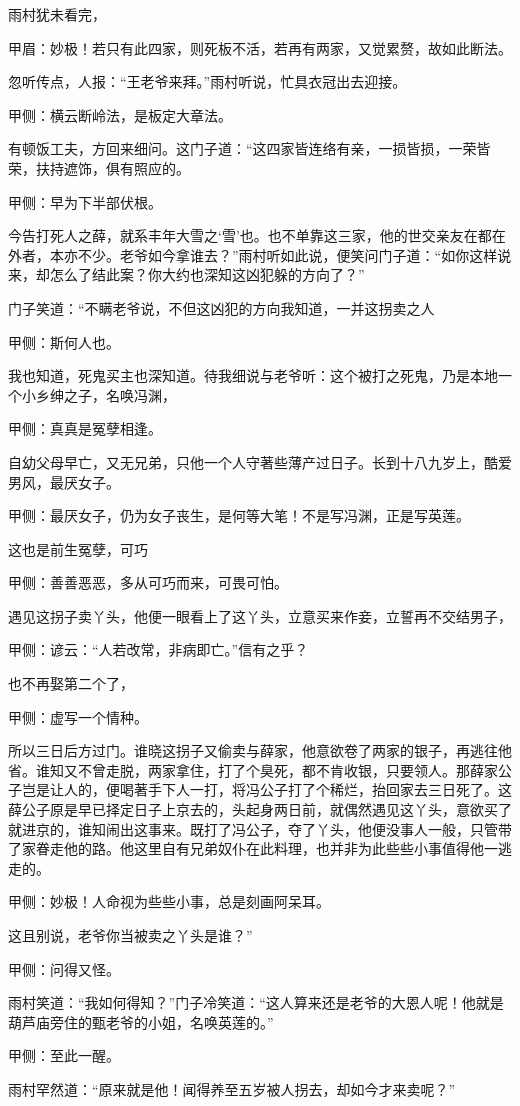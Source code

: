 \begin{parag}
    雨村犹未看完，\begin{note}甲眉：妙极！若只有此四家，则死板不活，若再有两家，又觉累赘，故如此断法。\end{note}忽听传点，人报：“王老爷来拜。”雨村听说，忙具衣冠出去迎接。\begin{note}甲侧：横云断岭法，是板定大章法。\end{note}有顿饭工夫，方回来细问。这门子道：“这四家皆连络有亲，一损皆损，一荣皆荣，扶持遮饰，俱有照应的。\begin{note}甲侧：早为下半部伏根。\end{note}今告打死人之薛，就系丰年大雪之‘雪’也。也不单靠这三家，他的世交亲友在都在外者，本亦不少。老爷如今拿谁去？”雨村听如此说，便笑问门子道：“如你这样说来，却怎么了结此案？你大约也深知这凶犯躲的方向了？”
\end{parag}


\begin{parag}
    门子笑道：“不瞒老爷说，不但这凶犯的方向我知道，一并这拐卖之人\begin{note}甲侧：斯何人也。\end{note}我也知道，死鬼买主也深知道。待我细说与老爷听：这个被打之死鬼，乃是本地一个小乡绅之子，名唤冯渊，\begin{note}甲侧：真真是冤孽相逢。\end{note}自幼父母早亡，又无兄弟，只他一个人守著些薄产过日子。长到十八九岁上，酷爱男风，最厌女子。\begin{note}甲侧：最厌女子，仍为女子丧生，是何等大笔！不是写冯渊，正是写英莲。\end{note}这也是前生冤孽，可巧\begin{note}甲侧：善善恶恶，多从可巧而来，可畏可怕。\end{note}遇见这拐子卖丫头，他便一眼看上了这丫头，立意买来作妾，立誓再不交结男子，\begin{note}甲侧：谚云：“人若改常，非病即亡。”信有之乎？\end{note}也不再娶第二个了，\begin{note}甲侧：虚写一个情种。\end{note}所以三日后方过门。谁晓这拐子又偷卖与薛家，他意欲卷了两家的银子，再逃往他省。谁知又不曾走脱，两家拿住，打了个臭死，都不肯收银，只要领人。那薛家公子岂是让人的，便喝著手下人一打，将冯公子打了个稀烂，抬回家去三日死了。这薛公子原是早已择定日子上京去的，头起身两日前，就偶然遇见这丫头，意欲买了就进京的，谁知闹出这事来。既打了冯公子，夺了丫头，他便没事人一般，只管带了家眷走他的路。他这里自有兄弟奴仆在此料理，也并非为此些些小事值得他一逃走的。\begin{note}甲侧：妙极！人命视为些些小事，总是刻画阿呆耳。\end{note}这且别说，老爷你当被卖之丫头是谁？”\begin{note}甲侧：问得又怪。\end{note}雨村笑道：“我如何得知？”门子冷笑道：“这人算来还是老爷的大恩人呢！他就是葫芦庙旁住的甄老爷的小姐，名唤英莲的。”\begin{note}甲侧：至此一醒。\end{note}雨村罕然道：“原来就是他！闻得养至五岁被人拐去，却如今才来卖呢？”
\end{parag}



